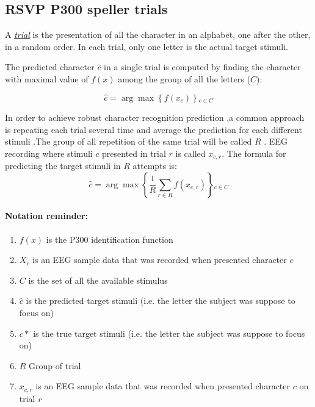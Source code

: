 \documentclass[
12pt, %
english, %
doublespacing, %
headsepline, %
]{MastersDoctoralThesis} %
\begin{document}
\subsection{RSVP P300 speller trials}

A \underline{\textit{trial}} is the presentation of all the character in an alphabet, one after the other, in a random order. In each trial, only one letter is the actual target stimuli.  

The predicted character $\hat{c}$ in a single trial is computed by finding the character with maximal value of $f(x)$ among the group of all the letters ($C$):


\begin{equation}
\hat{c} = \arg \max \left\{ {f\left( {{x_{c}}} \right)} \right\}{  _{c \in C}}
\end{equation}

In order to achieve robust character recognition prediction ,a common approach is repeating each trial several time and average the prediction for each different stimuli .The group of all repetition of the same trial will be called $R$ . EEG recording where stimuli $c$ presented in trial $r$ is called $x_{c,r}$. The formula for predicting the target stimuli in $R$ attempts is:
\begin{equation}
\hat c = \arg \max \left\{ {\frac{1}{R}\sum\limits_{r \in R}^{} {f\left( {{x_{c,r}}} \right)} } \right\}{_{c \in C}}
\end{equation}

\paragraph{Notation reminder:}
\begin{enumerate}
	\item $f(x)$ is the P300 identification function
	\item $X_c$ is an EEG sample data that was recorded when presented character $c$
	\item $C$ is the set of all the available stimulus 
	\item $\hat{c}$ is the predicted target stimuli (i.e. the letter the subject was suppose to focus on)
	\item $c*$ is the true target stimuli (i.e. the letter the subject was suppose to focus on)	
	\item $R$ Group of trial
	\item $x_{c,r}$ is an EEG sample data that was recorded when presented character $c$ on trial $r$
	
\end{enumerate}
\end{document}
